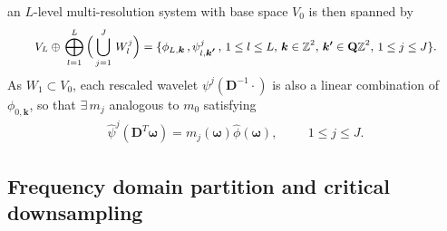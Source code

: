  an $L$-level multi-resolution system with base space $V_0$ is then spanned by
 \begin{align}\label{eq: MRA}
 V_L\oplus\,\bigoplus_{l=1}^L\Big(\bigcup_{j=1}^J\, W_l^j\Big) =
 \{\phi_{L,\boldsymbol{k}}\,,\psi^j_{l,\boldsymbol{k'}}\,, \, {\small 1\leq l \leq L,\, \boldsymbol{k}\in \mathbb{Z}^2,\,\boldsymbol{k'}\in \mathbf{Q}\mathbb{Z}^2,\,1\leq j \leq J\}}.
\end{align}  
As $W_1\subset V_0$, each rescaled wavelet $\psi^j(\mathbf{D}^{-1}\cdot)$ is also a linear combination of $\phi_{0,\boldsymbol{k}}$, so that $\exists\, m_j$ analogous to $m_0$
satisfying 
\begin{align}\label{eq: mj}
\widehat{\psi}^j(\mathbf{D}^T\boldsymbol{\omega}) = m_j(\boldsymbol{\omega})\widehat{\phi}(\boldsymbol{\omega}),\hspace{1cm} 1\leq j \leq J.
\end{align}


\subsection{Frequency domain partition and critical downsampling}\label{subsec: frequency partition}


